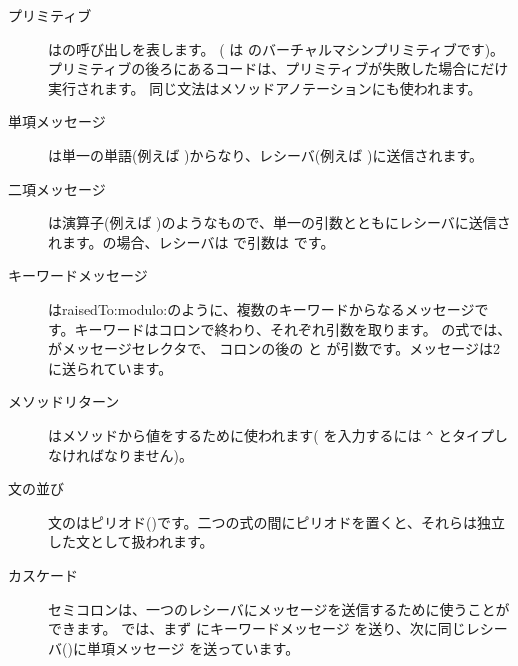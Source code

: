 \documentclass[a4paper,10pt,twoside]{book}
\begin{document}
\begin{description}
\item[プリミティブ] はの呼び出しを表します。
	( は  のバーチャルマシンプリミティブです)。
	プリミティブの後ろにあるコードは、プリミティブが失敗した場合にだけ実行されます。
	同じ文法はメソッドアノテーションにも使われます。

\item[単項メッセージ] は単一の単語(例えば )からなり、レシーバ(例えば )に送信されます。

\item[二項メッセージ] は演算子(例えば \ct{+})のようなもので、単一の引数とともにレシーバに送信されます。の場合、レシーバは  で引数は  です。

\item[キーワードメッセージ] はraisedTo:modulo:のように、複数のキーワードからなるメッセージです。キーワードはコロンで終わり、それぞれ引数を取ります。  の式では、 がメッセージセレクタで、 コロンの後の と  が引数です。メッセージは2に送られています。

\item[メソッドリターン] \ct{^}はメソッドから値をするために使われます(\ct{^} を入力するには \verb|^| とタイプしなければなりません)。

\item[文の並び] 文のはピリオド()です。二つの式の間にピリオドを置くと、それらは独立した文として扱われます。

\item[カスケード] セミコロンは、一つのレシーバにメッセージを送信するために使うことができます。 では、まず  にキーワードメッセージ  を送り、次に同じレシーバ()に単項メッセージ  を送っています。

\end{description}
\end{document}
